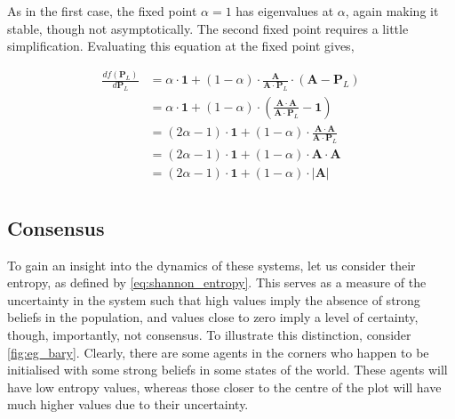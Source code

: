 As in the first case, the fixed point $\alpha = 1$ has eigenvalues at $\alpha$, again making it stable, though not asymptotically. The second fixed point requires a little simplification. Evaluating this equation at the fixed point gives,

\begin{align*}
    \frac{d f(\mathbf{P}_L)}{d \mathbf{P}_L} &= \alpha \cdot \mathbf{1} + (1 - \alpha) \cdot \frac{\mathbf{A}}{\mathbf{A} \cdot \mathbf{P}_L} \cdot \left(  \mathbf{A} - \mathbf{P}_L  \right)\\
    &= \alpha \cdot \mathbf{1} + (1 - \alpha) \cdot \left( \frac{\mathbf{A} \cdot \mathbf{A}}{\mathbf{A} \cdot \mathbf{P}_L} - \mathbf{1} \right) \\
    &= (2\alpha -1) \cdot \mathbf{1}  + (1 - \alpha) \cdot \frac{\mathbf{A} \cdot \mathbf{A}}{\mathbf{A} \cdot \mathbf{P}_L} \\
    &= (2\alpha -1) \cdot \mathbf{1}  + (1 - \alpha) \cdot \mathbf{A} \cdot \mathbf{A} \\
    &= (2\alpha -1) \cdot \mathbf{1}  + (1 - \alpha) \cdot |\mathbf{A}| \\
\end{align*}



\subsection{Consensus}

To gain an insight into the dynamics of these systems, let us consider their entropy, as defined by \cref{eq:shannon_entropy}. This serves as a measure of the uncertainty in the system such that high values imply the absence of strong beliefs in the population, and values close to zero imply a level of certainty, though, importantly, not consensus. To illustrate this distinction, consider \cref{fig:eg_bary}. Clearly, there are some agents in the corners who happen to be initialised with some strong beliefs in some states of the world. These agents will have low entropy values, whereas those closer to the centre of the plot will have much higher values due to their uncertainty. 

